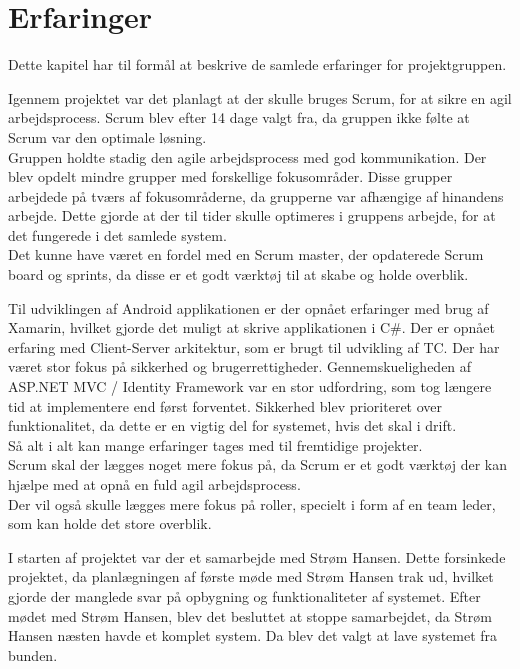 \chapter{Erfaringer}
Dette kapitel har til formål at beskrive de samlede erfaringer for projektgruppen. 

Igennem projektet var det planlagt at der skulle bruges Scrum, for at sikre en agil arbejdsprocess. Scrum blev efter 14 dage valgt fra, da gruppen ikke følte at Scrum var den optimale løsning.\\
Gruppen holdte stadig den agile arbejdsprocess med god kommunikation. Der blev opdelt mindre grupper med forskellige fokusområder. Disse grupper arbejdede på tværs af fokusområderne, da grupperne var afhængige af hinandens arbejde. Dette gjorde at der til tider skulle optimeres i gruppens arbejde, for at det fungerede i det samlede system.\\

Det kunne have været en fordel med en Scrum master, der opdaterede Scrum board og sprints, da disse er et godt værktøj til at skabe og holde overblik.

Til udviklingen af Android applikationen er der opnået erfaringer med brug af Xamarin, hvilket gjorde det muligt at skrive applikationen i C\#. 
\newline
Der er opnået erfaring med Client-Server arkitektur, som er brugt til udvikling af TC. 
\newline
Der har været stor fokus på sikkerhed og brugerrettigheder. Gennemskueligheden af ASP.NET MVC / Identity Framework var en stor udfordring, som tog længere tid at implementere end først forventet. Sikkerhed blev prioriteret over funktionalitet, da dette er en vigtig del for systemet, hvis det skal i drift.\\

Så alt i alt kan mange erfaringer tages med til fremtidige projekter.\\
Scrum skal der lægges noget mere fokus på, da Scrum er et godt værktøj der kan hjælpe med at opnå en fuld agil arbejdsprocess.\\
Der vil også skulle lægges mere fokus på roller, specielt i form af en team leder, som kan holde det store overblik.

I starten af projektet var der et samarbejde med Strøm Hansen. Dette forsinkede projektet, da planlægningen af første møde med Strøm Hansen trak ud, hvilket gjorde der manglede svar på opbygning og funktionaliteter af systemet. Efter mødet med Strøm Hansen, blev det besluttet at stoppe samarbejdet, da Strøm Hansen næsten havde et komplet system. Da blev det valgt at lave systemet fra bunden. 